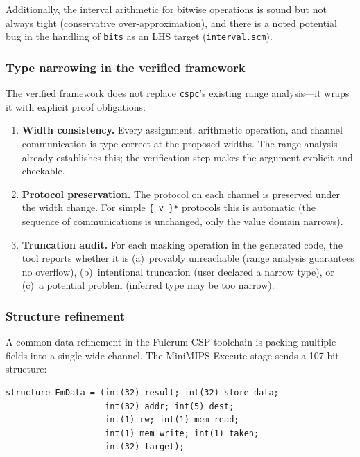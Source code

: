 \documentclass[11pt]{article}
\begin{document}
Additionally, the interval arithmetic for bitwise operations is sound
but not always tight (conservative over-approximation), and there is
a noted potential bug in the handling of \texttt{bits} as an LHS
target (\texttt{interval.scm}).

\subsubsection{Type narrowing in the verified framework}

The verified framework does not replace \texttt{cspc}'s existing
range analysis---it wraps it with explicit proof obligations:

\begin{enumerate}
\item \textbf{Width consistency.}  Every assignment, arithmetic
  operation, and channel communication is type-correct at the
  proposed widths.  The range analysis already establishes this; the
  verification step makes the argument explicit and checkable.

\item \textbf{Protocol preservation.}  The protocol on each channel
  is preserved under the width change.  For simple
  \texttt{\{ v \}*} protocols this is automatic (the sequence of
  communications is unchanged, only the value domain narrows).

\item \textbf{Truncation audit.}  For each masking operation in the
  generated code, the tool reports whether it is (a)~provably
  unreachable (range analysis guarantees no overflow), (b)~intentional
  truncation (user declared a narrow type), or (c)~a potential problem
  (inferred type may be too narrow).
\end{enumerate}

\subsubsection{Structure refinement}

A common data refinement in the Fulcrum CSP toolchain is packing
multiple fields into a single wide channel.  The MiniMIPS Execute
stage sends a 107-bit structure:

\begin{Verbatim}[samepage=true]
structure EmData = (int(32) result; int(32) store_data;
                    int(32) addr; int(5) dest;
                    int(1) rw; int(1) mem_read;
                    int(1) mem_write; int(1) taken;
                    int(32) target);
\end{Verbatim}
\end{document}
